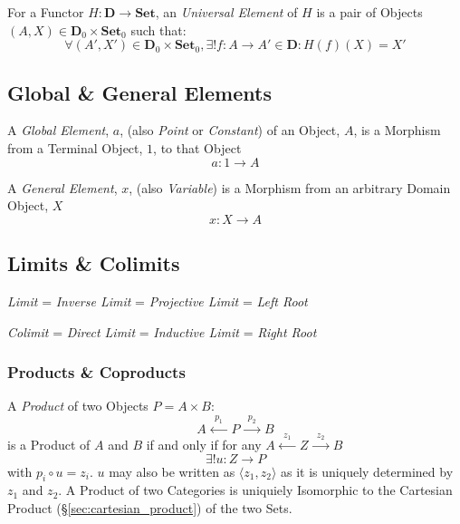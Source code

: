 For a Functor $H : \mathbf{D} \rightarrow \mathbf{Set}$, an
\emph{Universal Element} of $H$ is a pair of Objects $(A,X) \in
\mathbf{D}_0 \times \mathbf{Set}_0$ such that:
\[
    \forall (A',X') \in \mathbf{D}_0 \times \mathbf{Set}_0,
    \exists! f : A \rightarrow A' \in \mathbf{D} : H(f)(X) = X'
\]



\subsection{Global \& General Elements}\label{sec:general_element}

A \emph{Global Element}, $a$, (also \emph{Point} or \emph{Constant})
of an Object, $A$, is a Morphism from a Terminal Object, $1$, to that
Object
\[
    a: 1 \rightarrow A
\]

A \emph{General Element}, $x$, (also \emph{Variable}) is a Morphism
from an arbitrary Domain Object, $X$
\[
    x: X \rightarrow A
\]



\subsection{Limits \& Colimits}\label{sec:category_limits}

\emph{Limit} = \emph{Inverse Limit} = \emph{Projective Limit} =
\emph{Left Root}

\emph{Colimit} = \emph{Direct Limit} = \emph{Inductive Limit} =
\emph{Right Root}



\subsubsection{Products \& Coproducts}\label{sec:universal_product}

A \emph{Product} of two Objects $P = A \times B$:
\[
    A \xleftarrow{\;\;p_1\;\;} P \xrightarrow{\;\;p_2\;\;} B
\]
is a Product of $A$ and $B$ if and only if for any $A
\xleftarrow{\;\;z_1\;\;} Z \xrightarrow{\;\;z_2\;\;} B$
\[
    \exists!u : Z \rightarrow P
\]
with $p_i \circ u = z_i$. $u$ may also be written as $\langle z_1, z_2
\rangle$ as it is uniquely determined by $z_1$ and $z_2$. A Product of
two Categories is uniquiely Isomorphic to the Cartesian Product
(\S\ref{sec:cartesian_product}) of the two Sets.

